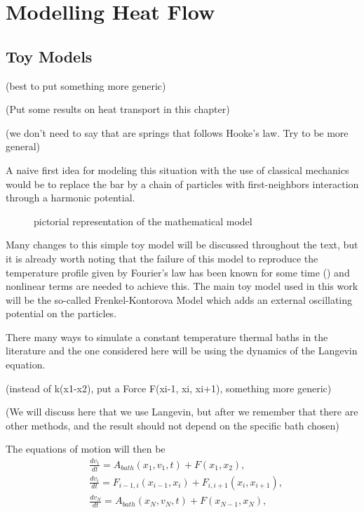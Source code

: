 
\chapter{Modelling Heat Flow}

\section{Toy Models}

(best to put something more generic)


(Put some results on heat transport in this chapter)

(we don't need to say that are springs that follows Hooke's law. Try to be more general)

A naive first idea for modeling this situation with the use of classical mechanics would be to replace the bar by a chain of particles with first-neighbors interaction through a harmonic potential.

\begin{figure}[H] 
	\centering 
	\fontsize{18}{14} 
	\label{ch2_3} 
	\caption{pictorial representation of the mathematical model}
\end{figure} 

Many changes to this simple toy model will be discussed throughout the text, but it is already worth noting that the failure of this model to reproduce the temperature profile given by Fourier's law has been known for some time (\cite{riederPropertiesHarmonic1967}) and nonlinear terms are needed to achieve this. The main toy model used in this work will be the so-called Frenkel-Kontorova Model which adds an external oscillating potential on the particles. 

There many ways to simulate a constant temperature thermal baths in the literature and the one considered here will be using the dynamics of the Langevin equation.

(instead of k(x1-x2), put a Force F(xi-1, xi, xi+1), something more generic)

(We will discuss here that we use Langevin, but after we remember that there are other methods, and the result should not depend on the specific bath chosen)

The equations of motion will then be
\begin{equation}\label{eq:1}
\begin{aligned}
&\frac{d v_1}{dt} = A_{bath}(x_{1},v_{1},t) + F(x_1, x_2),\\
&\frac{d v_i}{dt} = F_{i-1,i}(x_{i-1}, x_i) + F_{i,i+1}(x_{i}, x_{i+1}),\\
&\frac{d v_N}{dt} = A_{bath}(x_{N}, v_{N}, t) + F(x_{N-1}, x_N),
\end{aligned}
\end{equation}

